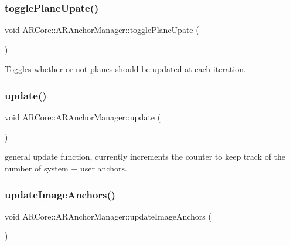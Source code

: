 \subsubsection{\texorpdfstring{toggle\+Plane\+Upate()}{togglePlaneUpate()}}
{\footnotesize\ttfamily void A\+R\+Core\+::\+A\+R\+Anchor\+Manager\+::toggle\+Plane\+Upate (\begin{DoxyParamCaption}{ }\end{DoxyParamCaption})\hspace{0.3cm}{\ttfamily [inline]}}



Toggles whether or not planes should be updated at each iteration. 

\mbox{\label{class_a_r_core_1_1_a_r_anchor_manager_af4b19656d608761d25661d6720a4c2f3}} 
\subsubsection{\texorpdfstring{update()}{update()}}
{\footnotesize\ttfamily void A\+R\+Core\+::\+A\+R\+Anchor\+Manager\+::update (\begin{DoxyParamCaption}{ }\end{DoxyParamCaption})}



general update function, currently increments the counter to keep track of the number of system + user anchors. 

\mbox{\label{class_a_r_core_1_1_a_r_anchor_manager_a6b5fc9e3d6e318fb1be3a7cc4e867b16}} 
\subsubsection{\texorpdfstring{update\+Image\+Anchors()}{updateImageAnchors()}}
{\footnotesize\ttfamily void A\+R\+Core\+::\+A\+R\+Anchor\+Manager\+::update\+Image\+Anchors (\begin{DoxyParamCaption}{ }\end{DoxyParamCaption})}

